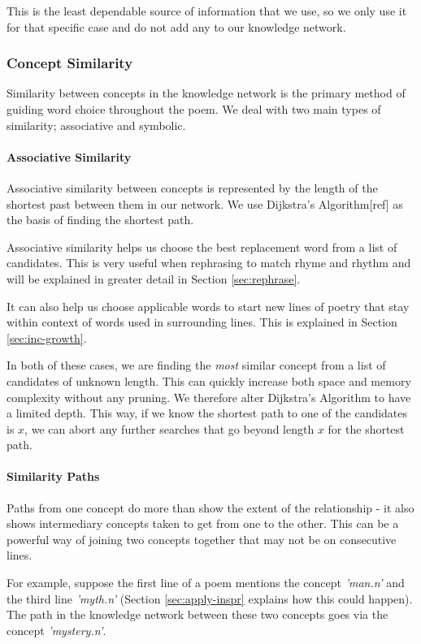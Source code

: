 This is the least dependable source of information that we use, so we only use it for that specific case and do not add any to our knowledge network.


\subsubsection{Concept Similarity}
Similarity between concepts in the knowledge network is the primary method of guiding word choice throughout the poem. We deal with two main types of similarity; associative and symbolic.

\paragraph{Associative Similarity}
\label{sec:assoc-sim}
Associative similarity between concepts is represented by the length of the shortest past between them in our network. We use Dijkstra's Algorithm[ref] as the basis of finding the shortest path.

Associative similarity helps us choose the best replacement word from a list of candidates. This is very useful when rephrasing to match rhyme and rhythm and will be explained in greater detail in Section \ref{sec:rephrase}. 

It can also help us choose applicable words to start new lines of poetry that stay within context of words used in surrounding lines. This is explained in Section \ref{sec:inc-growth}.

In both of these cases, we are finding the \textit{most} similar concept from a list of candidates of unknown length. This can quickly increase both space and memory complexity without any pruning. We therefore alter Dijkstra's Algorithm to have a limited depth. This way, if we know the shortest path to one of the candidates is $x$, we can abort any further searches that go beyond length $x$ for the shortest path.

\paragraph{Similarity Paths}
Paths from one concept do more than show the extent of the relationship - it also shows intermediary concepts taken to get from one to the other. This can be a powerful way of joining two concepts together that may not be on consecutive lines.

For example, suppose the first line of a poem mentions the concept \textit{'man.n'} and the third line \textit{'myth.n'} (Section \ref{sec:apply-inspr} explains how this could happen). The path in the knowledge network between these two concepts goes via the concept \textit{'mystery.n'}.



